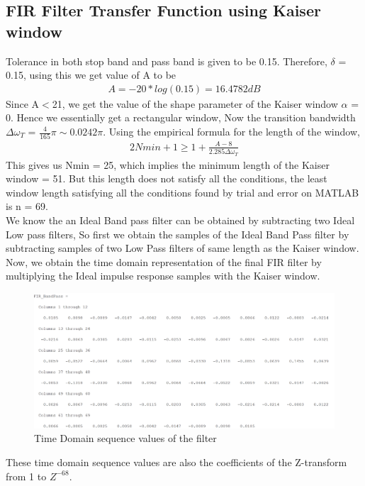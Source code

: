 \documentclass[12pt]{article}
\begin{document}
	\subsection{FIR Filter Transfer Function using Kaiser window}
	\color{black}
	Tolerance in both stop band and pass band is given to be 0.15. Therefore, $\delta$ = 0.15, using this we get value of A to be
	\begin{gather*}
		A = -20*log(0.15) = 16.4782 dB
	\end{gather*}
	Since A$<$21, we get the value of the shape parameter of the Kaiser window $\alpha$ = 0. Hence we essentially get a rectangular window, Now the transition bandwidth $\Delta\omega_T$ = $\frac{4}{165} \pi \sim 0.0242\pi$. Using the empirical formula for the length of the window,
	\begin{gather*}
		2Nmin + 1 \ge 1 + \frac{A-8}{2.285\Delta\omega_T}
	\end{gather*}
	This gives us Nmin = 25, which implies the minimum length of the Kaiser window = 51. But this length does not satisfy all the conditions, the least window length satisfying all the conditions found by trial and error on MATLAB is n = 69.\\
	We know the an Ideal Band pass filter can be obtained by subtracting two Ideal Low pass filters, So first we obtain the samples of the Ideal Band Pass filter by subtracting samples of two Low Pass filters of same length as the Kaiser window. Now, we obtain the time domain representation of the final FIR filter by multiplying the Ideal impulse response samples with the Kaiser window.
\begin{figure}[H]
	\centering
	\includegraphics[width  = 18cm]{Filter1hn.png}
	\caption{Time Domain sequence values of the filter}
\end{figure}
\noindent These time domain sequence values are also the coefficients of the Z-transform from 1 to $Z^{-68}$.
\end{document}
